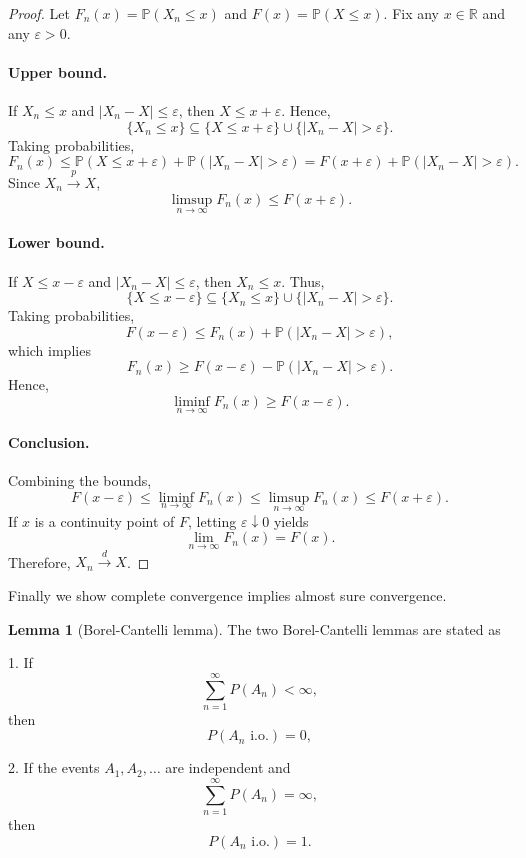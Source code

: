 \documentclass[11pt]{article}
\theoremstyle{definition}
\newtheorem{lemma}{Lemma}[section]
\begin{document}
\begin{proof}
Let \(F_n(x) = \mathbb{P}(X_n \le x)\) and \(F(x) = \mathbb{P}(X \le x)\).
Fix any \(x \in \mathbb{R}\) and any \(\varepsilon > 0\).

\paragraph{Upper bound.}
If \(X_n \le x\) and \(|X_n - X| \le \varepsilon\), then \(X \le x + \varepsilon\).
Hence,
\[
\{X_n \le x\}
\subseteq
\{X \le x + \varepsilon\} \cup \{|X_n - X| > \varepsilon\}.
\]
Taking probabilities,
\[
F_n(x)
\le
\mathbb{P}(X \le x + \varepsilon) + \mathbb{P}(|X_n - X| > \varepsilon)
=
F(x + \varepsilon) + \mathbb{P}(|X_n - X| > \varepsilon).
\]
Since \(X_n \xrightarrow{p} X\),
\[
\limsup_{n \to \infty} F_n(x) \le F(x + \varepsilon).
\]

\paragraph{Lower bound.}
If \(X \le x - \varepsilon\) and \(|X_n - X| \le \varepsilon\), then \(X_n \le x\).
Thus,
\[
\{X \le x - \varepsilon\}
\subseteq
\{X_n \le x\} \cup \{|X_n - X| > \varepsilon\}.
\]
Taking probabilities,
\[
F(x - \varepsilon)
\le
F_n(x) + \mathbb{P}(|X_n - X| > \varepsilon),
\]
which implies
\[
F_n(x) \ge F(x - \varepsilon) - \mathbb{P}(|X_n - X| > \varepsilon).
\]
Hence,
\[
\liminf_{n \to \infty} F_n(x) \ge F(x - \varepsilon).
\]

\paragraph{Conclusion.}
Combining the bounds,
\[
F(x - \varepsilon)
\le
\liminf_{n \to \infty} F_n(x)
\le
\limsup_{n \to \infty} F_n(x)
\le
F(x + \varepsilon).
\]
If \(x\) is a continuity point of \(F\), letting \(\varepsilon \downarrow 0\) yields
\[
\lim_{n \to \infty} F_n(x) = F(x).
\]
Therefore, \(X_n \xrightarrow{d} X\).
\end{proof}
Finally we show complete convergence implies almost sure convergence.

\begin{lemma} [Borel-Cantelli lemma]
The two Borel-Cantelli lemmas are stated as

1. If
    \[
    \sum_{n=1}^\infty P(A_n) < \infty,
    \]
    then
    \[
    P(A_n \text{ i.o.}) = 0,
    \]

2. If the events \(A_1, A_2, \dots\) are independent and
    \[
    \sum_{n=1}^\infty P(A_n) = \infty,
    \]
    then
    \[
    P(A_n \text{ i.o.}) = 1.
    \]
\end{lemma}
\end{document}
